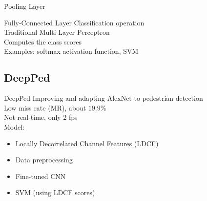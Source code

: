 \begin{frame}{Pooling Layer}
\end{frame}

\begin{frame}{Fully-Connected Layer}
  Classification operation\\
  \vspace{2mm}
  Traditional Multi Layer Perceptron\\
  \vspace{2mm}
  Computes the class scores\\
  \vspace{2mm}
  Examples: softmax activation function, SVM

\end{frame}
\subsection{DeepPed}
\begin{frame}{DeepPed}
  Improving and adapting AlexNet to pedestrian detection\\
  \vspace{2mm}
  Low miss rate (MR), about $19.9\%$\\
  \vspace{2mm}
  Not real-time, only 2 fps\\
  \vspace{2mm}
  Model:
  \begin{itemize}
    \item Locally Decorrelated Channel Features (LDCF)
    \item Data preprocessing
    \item Fine-tuned CNN
    \item SVM (using LDCF scores)
  \end{itemize}
\end{frame}

